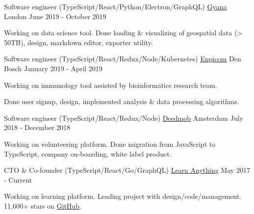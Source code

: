 
\begin{cventries}

  \cventry
    {Software engineer (TypeScript/React/Python/Electron/GraphQL)}
    {\href{https://www.gyana.co.uk}{Gyana}}
    {London}
    {June 2019 - October 2019}
     {
      \begin{cvitems}
        \item {Working on data science tool. Done loading \& visualizing of geospatial data (> 50TB), design, markdown editor, exporter utility.}
      \end{cvitems}
    }

  \cventry
    {Software engineer (TypeScript/React/Redux/Node/Kubernetes)}
    {\href{https://www.enpicom.com}{Enpicom}}
    {Den Bosch}
    {January 2019 - April 2019}
     {
      \begin{cvitems}
        \item {Working on immunology tool assisted by bioinformatics research team.}
        \item {Done user signup, design, implemented analysis \& data processing algorithms.}
      \end{cvitems}
    }

  \cventry
    {Software engineer (TypeScript/React/Redux/Node)}
    {\href{https://www.deedmob.com}{Deedmob}}
    {Amsterdam}
    {July 2018 - December 2018}
     {
      \begin{cvitems}
        \item {Working on volunteering platform. Done migration from JavaScript to TypeScript, company on-boarding, white label product.}
      \end{cvitems}
    }

  \cventry
    {CTO \& Co-founder (TypeScript/React/Go/GraphQL)}
    {\href{https://learn-anything.xyz}{Learn Anything}}
    {}
    {May 2017 - Current}
     {
      \begin{cvitems}
        \item {Working on learning platform. Leading project with design/code/management. 11,600+ stars on \href{https://github.com/learn-anything/learn-anything}{GitHub}.}
      \end{cvitems}
    }

\end{cventries}
